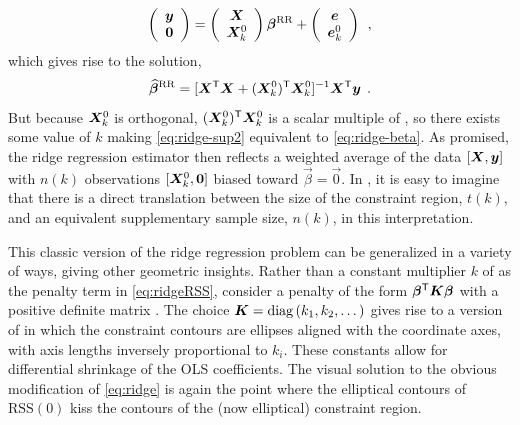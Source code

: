 \begin{equation} \label{eq:ridge-sup1}
\left(
\begin{array}{c} \bm{y} \\ \bm{0} \end{array}
\right)
=
\left(
\begin{array}{c} \bm{X} \\ \bm{X}_k^0 \end{array}
\right)
\bm{\beta}^{\mathrm{RR}} + 
\left(
\begin{array}{c} \bm{e} \\ \bm{e}_k^0 \end{array}
\right)
\:\: ,
\end{equation}
which gives rise to the solution,
\begin{equation} \label{eq:ridge-sup2}
\widehat{\bm{\beta}}^{\mathrm{RR}} = [\bm{X}^\mathsf{T} \bm{X} + (\bm{X}_k^0)^\mathsf{T} \bm{X}_k^0]^{-1} \bm{X}^\mathsf{T} \bm{y} \:\: .
\end{equation}
But because $\bm{X}_k^0$ is orthogonal, $(\bm{X}_k^0)^\mathsf{T} \bm{X}_k^0$ is a scalar multiple of , so there
exists some value of $k$ making \eqref{eq:ridge-sup2} equivalent to \eqref{eq:ridge-beta}.  As promised, the
ridge regression estimator then reflects a weighted average of the data $[\bm{X}, \bm{y}]$ with $n(k)$ observations
$[\bm{X}_k^0, \bm{0}]$
biased toward $\vec{\beta}=\vec{0}$. In , it is easy to imagine that there is a direct translation between
the size of the constraint region, $t(k)$, and an equivalent supplementary sample size, $n(k)$, in this interpretation.

This classic version of the ridge regression problem can be generalized in a variety of ways, giving other geometric
insights.  Rather than a constant multiplier $k$ of \vec{\beta}\trans \vec{\beta} as the penalty term in \eqref{eq:ridgeRSS},
consider a penalty of the form $\bm{\beta}^\mathsf{T} \bm{K} \bm{\beta}$ with
a positive definite matrix .
The choice $\bm{K} = \mathrm{diag}\, (k_1, k_2, \dots)$ gives rise to a version of
 in which the constraint contours are ellipses aligned with the coordinate axes, with
axis lengths inversely proportional to $k_i$.  These constants allow for differential shrinkage of the OLS coefficients.
The visual solution to the obvious modification of \eqref{eq:ridge} is again the point where the elliptical
contours of $\mathrm{RSS}(0)$ kiss the contours of the (now elliptical) constraint region.




